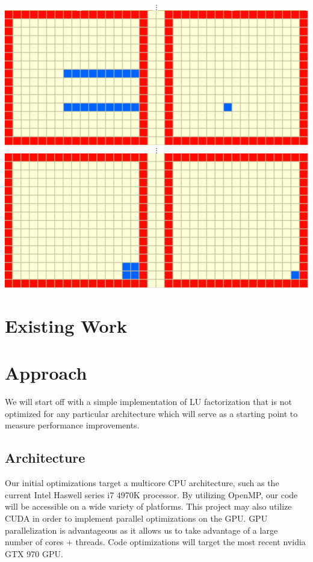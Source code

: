 \documentclass[12]{article}
\begin{document}
\begin{center}
$$\vdots$$
\includegraphics[scale=0.33]{figures/lu6}
$$\vdots$$
\includegraphics[scale=0.33]{figures/lu7}
\end{center}

\section{Existing Work}

\section{Approach}

We will start off with a simple implementation of LU factorization that is not optimized for any particular architecture which will serve as a starting point to measure performance improvements.


\subsection{Architecture}

Our initial optimizations target a multicore CPU architecture, such as the current Intel Haswell series i7 4970K processor. By utilizing OpenMP, our code will be accessible on a wide variety of platforms. This project may also utilize CUDA in order to implement parallel optimizations on the GPU. GPU parallelization is advantageous as it allows us to take advantage of a large number of cores + threads. Code optimizations will target the most recent nvidia GTX 970 GPU. 
\end{document}
